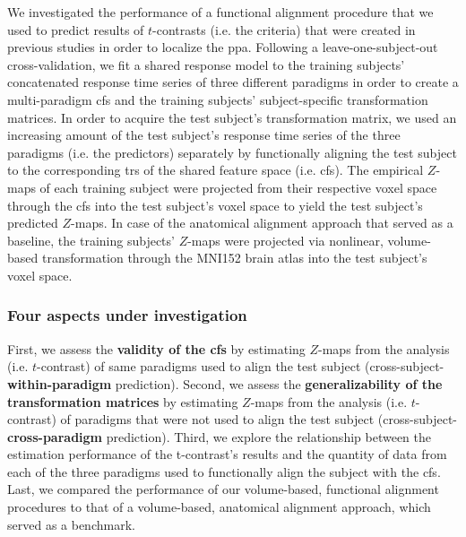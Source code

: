 %
We investigated the performance of a functional alignment procedure that we used
to predict results of $t$-contrasts (i.e. the criteria) that were created in
previous studies \citep{sengupta2016extension, haeusler2022processing} in order
to localize the \ac{ppa}.
%
Following a leave-one-subject-out cross-validation, we fit a shared response
model \citep{chen2015reduced} to the training subjects' concatenated response
time series of three different paradigms in order to create a multi-paradigm
\ac{cfs} and the training subjects' subject-specific transformation matrices.
%
In order to acquire the test subject's transformation matrix, we used an
increasing amount of the test subject's response time series of the three
paradigms (i.e. the predictors)  separately by functionally aligning the test
subject to the corresponding \acp{tr} of the shared feature space (i.e.
\ac{cfs}).
%
The empirical $Z$-maps of each training subject were projected from their
respective voxel space through the \ac{cfs} into the test subject's voxel space
to yield the test subject's predicted $Z$-maps.
%
In case of the anatomical alignment approach that served as a baseline, the
training subjects' $Z$-maps were projected via nonlinear, volume-based
transformation through the MNI152 brain atlas into the test subject's voxel
space.


\subsubsection{Four aspects under investigation}



%
First, we assess the \textbf{validity of the \ac{cfs}} by estimating $Z$-maps
from the analysis (i.e. $t$-contrast) of same paradigms used to align the test
subject (cross-subject-\textbf{within-paradigm} prediction).
%
Second, we assess the \textbf{generalizability of the transformation matrices}
by estimating $Z$-maps from the analysis (i.e. $t$-contrast) of paradigms that
were not used to align the test subject (cross-subject-\textbf{cross-paradigm}
prediction).
%
Third, we explore the relationship between the estimation performance of the
t-contrast's results and the quantity of data from each of the three paradigms
used to functionally align the subject with the \ac{cfs}.
%
Last, we compared the performance of our volume-based, functional alignment
procedures to that of a volume-based, anatomical alignment approach, which
served as a benchmark.


